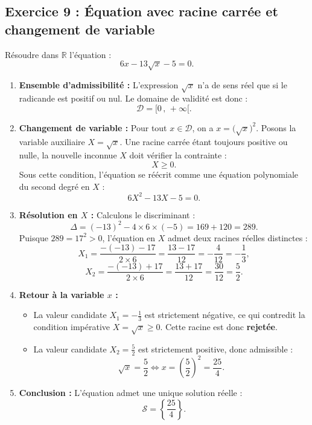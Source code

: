 \documentclass[11pt,a4paper]{article}
\newcommand{\R}{\mathbb{R}}
\begin{document}
\subsection*{Exercice 9 : Équation avec racine carrée et changement de variable}
Résoudre dans $\R$ l'équation :
\[
6x - 13\sqrt{x} - 5 = 0.
\]

\begin{correctionbox}
\begin{enumerate}
    \item \textbf{Ensemble d'admissibilité :}
    L'expression $\sqrt{x}$ n'a de sens réel que si le radicande est positif ou nul.
    Le domaine de validité est donc :
    \[
    \mathcal{D} = [0\,,\, +\infty[.
    \]

    \item \textbf{Changement de variable :}
    Pour tout $x \in \mathcal{D}$, on a $x = \bigl(\sqrt{x}\bigr)^2$.
    Posons la variable auxiliaire $X = \sqrt{x}$.
    Une racine carrée étant toujours positive ou nulle, la nouvelle inconnue $X$ doit vérifier la contrainte :
    \[
    X \ge 0.
    \]
    Sous cette condition, l'équation se réécrit comme une équation polynomiale du second degré en $X$ :
    \[
    6X^2 - 13X - 5 = 0.
    \]

    \item \textbf{Résolution en $X$ :}
    Calculons le discriminant :
    \[
    \Delta = (-13)^2 - 4 \times 6 \times (-5) = 169 + 120 = 289.
    \]
    Puisque $289 = 17^2 > 0$, l'équation en $X$ admet deux racines réelles distinctes :
    \[
    X_1 = \frac{-(-13) - 17}{2 \times 6} = \frac{13 - 17}{12} = -\frac{4}{12} = -\frac{1}{3},
    \]
    \[
    X_2 = \frac{-(-13) + 17}{2 \times 6} = \frac{13 + 17}{12} = \frac{30}{12} = \frac{5}{2}.
    \]

    \item \textbf{Retour à la variable $x$ :}
    \begin{itemize}
        \item La valeur candidate $X_1 = -\frac{1}{3}$ est strictement négative, ce qui contredit la condition impérative $X = \sqrt{x} \ge 0$. Cette racine est donc \textbf{rejetée}.
        \item La valeur candidate $X_2 = \frac{5}{2}$ est strictement positive, donc admissible :
        \[
        \sqrt{x} = \frac{5}{2} \iff x = \left(\frac{5}{2}\right)^2 = \frac{25}{4}.
        \]
    \end{itemize}

    \item \textbf{Conclusion :}
    L'équation admet une unique solution réelle :
    \[
    \mathcal{S} = \left\{ \frac{25}{4} \right\}.
    \]
\end{enumerate}
\end{correctionbox}
\end{document}

